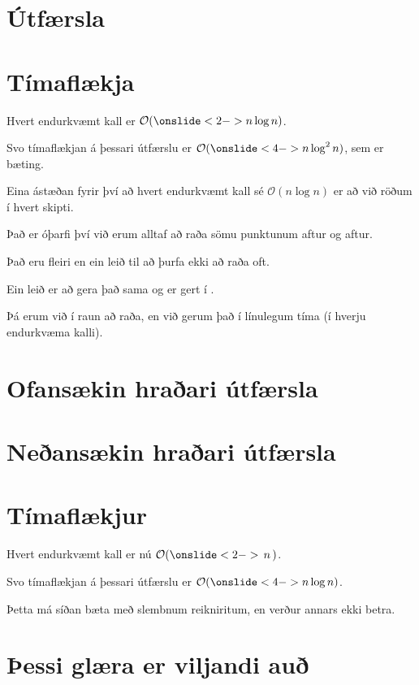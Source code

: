 \section{Útfærsla}
{
}

\section{Tímaflækja}
{
    {
        \item<1-> Hvert endurkvæmt kall er $\mathcal{O}(\onslide<2->{n \log n})$.
        \item<3-> Svo tímaflækjan á þessari útfærslu er $\mathcal{O}(\onslide<4->{n \log^2 n})$, sem er bæting.
        \item<5-> Eina ástæðan fyrir því að hvert endurkvæmt kall sé $\mathcal{O}(n \log n)$ er að við röðum í hvert skipti.
        \item<6-> Það er óþarfi því við erum alltaf að raða sömu punktunum aftur og aftur.
        \item<7-> Það eru fleiri en ein leið til að þurfa ekki að raða oft.
        \item<8-> Ein leið er að gera það sama og er gert í .
        \item<9-> Þá erum við í raun að raða, en við gerum það í línulegum tíma (í hverju endurkvæma kalli).
    }
}

\section{Ofansækin hraðari útfærsla}
{
}

\section{Neðansækin hraðari útfærsla}
{
}

\section{Tímaflækjur}
{
    {
        \item<1-> Hvert endurkvæmt kall er nú $\mathcal{O}(\onslide<2->{\,n\,})$.
        \item<3-> Svo tímaflækjan á þessari útfærslu er $\mathcal{O}(\onslide<4->{n \log n})$.
        \item<5-> Þetta má síðan bæta með slembnum reikniritum, en verður annars ekki betra.
    }
}

\section{Þessi glæra er viljandi auð}
{
}


